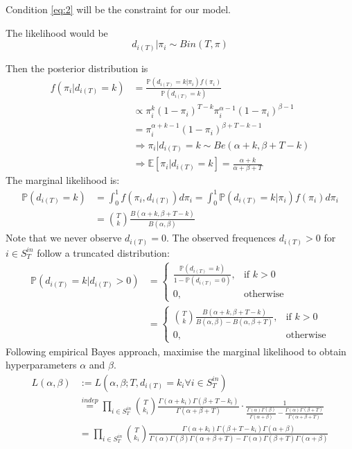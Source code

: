 \documentclass[a4paper, 12pt]{article}
\begin{document}
Condition \eqref{eq:2} will be the constraint for our model.

The likelihood would be
\begin{equation*}
    d_{i(T)} |\pi_i \sim Bin(T, \pi)
\end{equation*}

Then the posterior distribution is
\begin{align*}
    f(\pi_i | d_{i(T)} = k) &= \frac{\mathbb{P}(d_{i(T)} = k | \pi_i) f(\pi_i)}{\mathbb{P}(d_{i(T)} = k)} \\
    &\propto \pi_i^k(1 - \pi_i)^{T - k}\pi_i^{\alpha - 1}(1 - \pi_i)^{\beta - 1}\\
    &= \pi_i^{\alpha + k - 1}(1 - \pi_i)^{\beta + T - k - 1}\\
    &\Rightarrow \pi_i | d_{i(T)} = k \sim Be(\alpha + k, \beta + T - k)\\
    &\Rightarrow \mathbb{E}[\pi_i|d_{i(T)} = k] = \frac{\alpha + k}{\alpha + \beta + T}
\end{align*}
The marginal likelihood is:
\begin{align*}
    \mathbb{P}(d_{i(T)} = k) &= \int_0^1 f(\pi_i, d_{i(T)})d\pi_i = \int_0^1 \mathbb{P}(d_{i(T)} = k | \pi_i)f(\pi_i)d\pi_i\\
    &= \binom{T}{k} \frac{B(\alpha + k, \beta + T - k)}{B(\alpha, \beta)}
\end{align*}
Note that we never observe $d_{i(T)} = 0$. The observed frequences $d_{i(T)} > 0$ for $i \in S_{T}^{in}$ follow a truncated distribution:
\begin{align*}
\mathbb{P}(d_{i(T)} = k | d_{i(T)} > 0) &= 
\begin{cases}
    \frac{\mathbb{P}(d_{i(T)} = k)}{1 - \mathbb{P}(d_{i(T)} = 0)},& \text{if } k > 0 \\
    0, & \text{otherwise}
\end{cases}\\
&=
\begin{cases}
    \binom{T}{k} \frac{B(\alpha + k, \beta + T - k)}{B(\alpha, \beta) - B(\alpha, \beta + T)},& \text{if } k > 0 \\
    0, & \text{otherwise}
\end{cases}
\end{align*}
Following empirical Bayes approach, maximise the marginal likelihood to obtain hyperparameters $\alpha$ and $\beta$.
\begin{align} \label{eq:3}
    L(\alpha, \beta) &:= L(\alpha, \beta; T, d_{i(T)} = k_i \forall i \in S_T^{in}) \nonumber \\
    &\overset{indep}{=} \prod_{i \in S_T^{in}} \binom{T}{k_i} \frac{\Gamma(\alpha + k_i)\Gamma(\beta + T - k_i)}{\Gamma(\alpha + \beta + T)} \cdot \frac{1}{\frac{\Gamma(\alpha)\Gamma(\beta)}{\Gamma(\alpha + \beta)} - \frac{\Gamma(\alpha)\Gamma(\beta + T)}{\Gamma(\alpha + \beta + T)}} \nonumber \\
    &= \prod_{i \in S_T^{in}} \binom{T}{k_i} \frac{\Gamma(\alpha + k_i)\Gamma(\beta + T - k_i)\Gamma(\alpha + \beta)}{\Gamma(\alpha)\Gamma(\beta)\Gamma(\alpha + \beta + T) - \Gamma(\alpha)\Gamma(\beta + T)\Gamma(\alpha + \beta)} \nonumber \\
\end{align}
\end{document}
